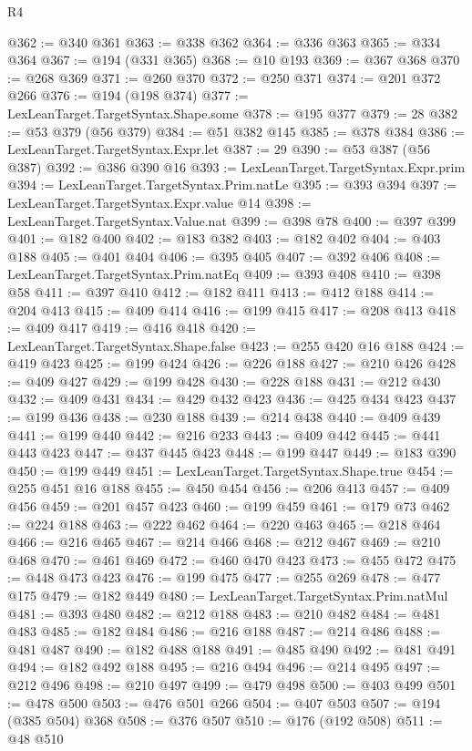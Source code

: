 \begin{lexlean}{R4}
\begin{coremodule}
@362 := @340 @361
@363 := @338 @362
@364 := @336 @363
@365 := @334 @364
@367 := @194 (@331 @365)
@368 := @10 @193
@369 := @367 @368
@370 := @268 @369
@371 := @260 @370
@372 := @250 @371
@374 := @201 @372 @266
@376 := @194 (@198 @374)
@377 := LexLeanTarget.TargetSyntax.Shape.some
@378 := @195 @377
@379 := 28
@382 := @53 @379 (@56 @379)
@384 := @51 @382 @145
@385 := @378 @384
@386 := LexLeanTarget.TargetSyntax.Expr.let
@387 := 29
@390 := @53 @387 (@56 @387)
@392 := @386 @390 @16
@393 := LexLeanTarget.TargetSyntax.Expr.prim
@394 := LexLeanTarget.TargetSyntax.Prim.natLe
@395 := @393 @394
@397 := LexLeanTarget.TargetSyntax.Expr.value @14
@398 := LexLeanTarget.TargetSyntax.Value.nat
@399 := @398 @78
@400 := @397 @399
@401 := @182 @400
@402 := @183 @382
@403 := @182 @402
@404 := @403 @188
@405 := @401 @404
@406 := @395 @405
@407 := @392 @406
@408 := LexLeanTarget.TargetSyntax.Prim.natEq
@409 := @393 @408
@410 := @398 @58
@411 := @397 @410
@412 := @182 @411
@413 := @412 @188
@414 := @204 @413
@415 := @409 @414
@416 := @199 @415
@417 := @208 @413
@418 := @409 @417
@419 := @416 @418
@420 := LexLeanTarget.TargetSyntax.Shape.false
@423 := @255 @420 @16 @188
@424 := @419 @423
@425 := @199 @424
@426 := @226 @188
@427 := @210 @426
@428 := @409 @427
@429 := @199 @428
@430 := @228 @188
@431 := @212 @430
@432 := @409 @431
@434 := @429 @432 @423
@436 := @425 @434 @423
@437 := @199 @436
@438 := @230 @188
@439 := @214 @438
@440 := @409 @439
@441 := @199 @440
@442 := @216 @233
@443 := @409 @442
@445 := @441 @443 @423
@447 := @437 @445 @423
@448 := @199 @447
@449 := @183 @390
@450 := @199 @449
@451 := LexLeanTarget.TargetSyntax.Shape.true
@454 := @255 @451 @16 @188
@455 := @450 @454
@456 := @206 @413
@457 := @409 @456
@459 := @201 @457 @423
@460 := @199 @459
@461 := @179 @73
@462 := @224 @188
@463 := @222 @462
@464 := @220 @463
@465 := @218 @464
@466 := @216 @465
@467 := @214 @466
@468 := @212 @467
@469 := @210 @468
@470 := @461 @469
@472 := @460 @470 @423
@473 := @455 @472
@475 := @448 @473 @423
@476 := @199 @475
@477 := @255 @269
@478 := @477 @175
@479 := @182 @449
@480 := LexLeanTarget.TargetSyntax.Prim.natMul
@481 := @393 @480
@482 := @212 @188
@483 := @210 @482
@484 := @481 @483
@485 := @182 @484
@486 := @216 @188
@487 := @214 @486
@488 := @481 @487
@490 := @182 @488 @188
@491 := @485 @490
@492 := @481 @491
@494 := @182 @492 @188
@495 := @216 @494
@496 := @214 @495
@497 := @212 @496
@498 := @210 @497
@499 := @479 @498
@500 := @403 @499
@501 := @478 @500
@503 := @476 @501 @266
@504 := @407 @503
@507 := @194 (@385 @504) @368
@508 := @376 @507
@510 := @176 (@192 @508)
@511 := @48 @510

\end{coremodule}
\end{lexlean}
